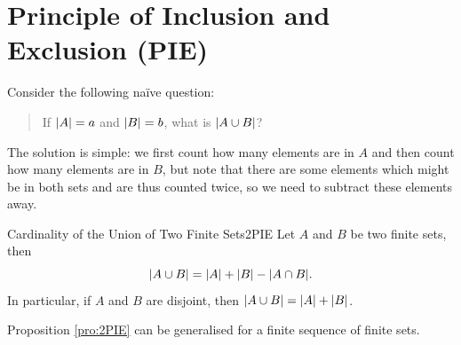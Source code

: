 \documentclass[math]{amznotes}
\theoremstyle{remark}
\newcommand{\0}{\mathbf{0}}
\newcommand{\1}{\mathbf{1}}
\begin{document}
\section{Principle of Inclusion and Exclusion (PIE)}
Consider the following naïve question:
\begin{quote}
    If ${\left\lvert {A} \right\rvert} = a$ and ${\left\lvert {B} \right\rvert} = b$, what is ${\left\lvert {A \cup B} \right\rvert}$?
\end{quote}
The solution is simple: we first count how many elements are in $A$ and then count how many elements are in $B$, but note that there are some elements which might be in both sets and are thus counted twice, so we need to subtract these elements away.
\begin{probox}{Cardinality of the Union of Two Finite Sets}{2PIE}
    Let $A$ and $B$ be two finite sets, then
    \begin{equation*}
        {\left\lvert {A \cup B} \right\rvert} = {\left\lvert {A} \right\rvert} + {\left\lvert {B} \right\rvert} - {\left\lvert {A \cap B} \right\rvert}.
    \end{equation*}
    In particular, if $A$ and $B$ are disjoint, then ${\left\lvert {A \cup B} \right\rvert} = {\left\lvert {A} \right\rvert} + {\left\lvert {B} \right\rvert}$.
\end{probox}
Proposition \ref{pro:2PIE} can be generalised for a finite sequence of finite sets.
\end{document}
